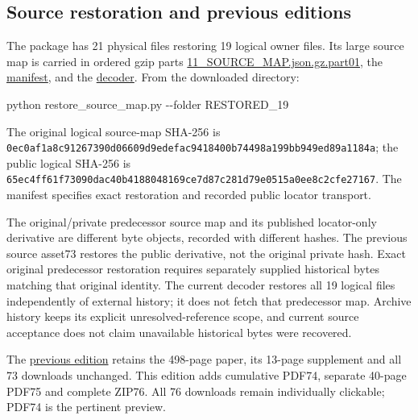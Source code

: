 \documentclass[
]{article}
\newenvironment{Shaded}{}{}
\newcommand{\NormalTok}[1]{#1}
\begin{document}
\subsection{Source restoration and previous
editions}\label{source-restoration-and-previous-editions}

The package has 21 physical files restoring 19 logical owner files. Its
large source map is carried in ordered gzip parts
\href{https://github.com/KokunoYumeto/zeta-function-research-reader/blob/02e47c28b98912d3ea1ec1bf01a3a5ba44197e9f/workbenches/splitzero-tandem/continuations/20260915-primitive-band-continuation/11_SOURCE_MAP.json.gz.part01}{11\_SOURCE\_MAP.json.gz.part01},
the
\href{https://github.com/KokunoYumeto/zeta-function-research-reader/blob/02e47c28b98912d3ea1ec1bf01a3a5ba44197e9f/workbenches/splitzero-tandem/continuations/20260915-primitive-band-continuation/SOURCE_MAP_TRANSPORT.json}{manifest},
and the
\href{https://github.com/KokunoYumeto/zeta-function-research-reader/blob/02e47c28b98912d3ea1ec1bf01a3a5ba44197e9f/workbenches/splitzero-tandem/continuations/20260915-primitive-band-continuation/restore_source_map.py}{decoder}.
From the downloaded directory:

\begin{Shaded}
\begin{Highlighting}[]
\NormalTok{python restore\_source\_map.py {-}{-}folder RESTORED\_19}
\end{Highlighting}
\end{Shaded}

The original logical source-map SHA-256 is
\texttt{0ec0af1a8c91267390d06609d9edefac9418400b74498a199bb949ed89a1184a};
the public logical SHA-256 is
\texttt{65ec4ff61f73090dac40b4188048169ce7d87c281d79e0515a0ee8c2cfe27167}.
The manifest specifies exact restoration and recorded public locator
transport.

The original/private predecessor source map and its published
locator-only derivative are different byte objects, recorded with
different hashes. The previous source asset73 restores the public
derivative, not the original private hash. Exact original predecessor
restoration requires separately supplied historical bytes matching that
original identity. The current decoder restores all 19 logical files
independently of external history; it does not fetch that predecessor
map. Archive history keeps its explicit unresolved-reference scope, and
current source acceptance does not claim unavailable historical bytes
were recovered.

The \href{https://doi.org/10.5281/zenodo.22772244}{previous edition}
retains the 498-page paper, its 13-page supplement and all 73 downloads
unchanged. This edition adds cumulative PDF74, separate 40-page PDF75
and complete ZIP76. All 76 downloads remain individually clickable;
PDF74 is the pertinent preview.
\end{document}
